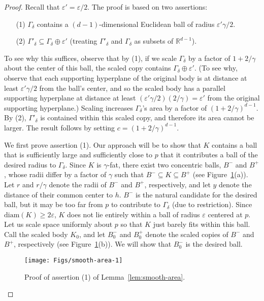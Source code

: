 \documentclass[11pt]{article}   \usepackage[letterpaper,hmargin=2.1cm,vmargin=3cm]{geometry}
\newcommand{\RE}{\mathbb{R}}    \newcommand{\ZZ}{\mathbb{Z}}    \newcommand{\eps}{\varepsilon}  \newcommand{\ST}{\,:\,}         \newcommand{\sq}{\square}
\newcommand{\diam}{\mathrm{diam}}
\begin{document}
{\SmoothAreaStmt*}
\begin{proof}
Recall that $\eps' = \eps/2$. The proof is based on two assertions: 
\begin{enumerate}
\setlength{\itemsep}{-0.5ex}\setlength{\parsep}{0pt}\item[(1)] $\Gamma_{\delta}$ contains a $(d-1)$-dimensional Euclidean ball of radius $\eps'\gamma/2$.

\item[(2)] $\Gamma'_{\delta} \subseteq \Gamma_{\delta} \oplus \eps'$ (treating $\Gamma'_{\delta}$ and $\Gamma_{\delta}$ as subsets of $\RE^{d-1}$).
\end{enumerate}
To see why this suffices, observe that by (1), if we scale $\Gamma_{\delta}$ by a factor of $1 + 2/\gamma$ about the center of this ball, the scaled copy contains $\Gamma_{\delta} \oplus \eps'$. (To see why, observe that each supporting hyperplane of the original body is at distance at least $\eps'\gamma/2$ from the ball's center, and so the scaled body has a parallel supporting hyperplane at distance at least $(\eps'\gamma/2)(2/\gamma) = \eps'$ from the original supporting hyperplane.) Scaling increases $\Gamma_{\delta}$'s area by a factor of $(1 + 2/\gamma)^{d-1}$. By (2), $\Gamma'_{\delta}$ is contained within this scaled copy, and therefore its area cannot be larger. The result follows by setting $c = (1 + 2/\gamma)^{d-1}$.

We first prove assertion (1). Our approach will be to show that $K$ contains a ball that is sufficiently large and sufficiently close to $p$ that it contributes a ball of the desired radius to $\Gamma_{\delta}$. Since $K$ is $\gamma$-fat, there exist two concentric balls, $B^-$ and $B^+$, whose radii differ by a factor of $\gamma$ such that $B^- \subseteq K \subseteq B^+$ (see Figure~\ref{fig:smooth-area-1}(a)). Let $r$ and $r/\gamma$ denote the radii of $B^-$ and $B^+$, respectively, and let $y$ denote the distance of their common center to $h$. $B^-$ is the natural candidate for the desired ball, but it may be too far from $p$ to contribute to $\Gamma_{\delta}$ (due to restriction). Since $\diam(K) \ge 2 \eps$, $K$ does not lie entirely within a ball of radius $\eps$ centered at $p$. Let us scale space uniformly about $p$ so that $K$ just barely fits within this ball. Call the scaled body $K_0$, and let $B_0^-$ and $B_0^+$ denote the scaled copies of $B^-$ and $B^+$, respectively (see Figure~\ref{fig:smooth-area-1}(b)). We will show that $B_0^-$ is the desired ball. 

\begin{figure}[htbp]
  \centerline{\texttt{[image: Figs/smooth-area-1]}}
  \caption{Proof of assertion (1) of Lemma~\ref{lem:smooth-area}.}
  \label{fig:smooth-area-1}
\end{figure}



\end{proof}
\end{document}
